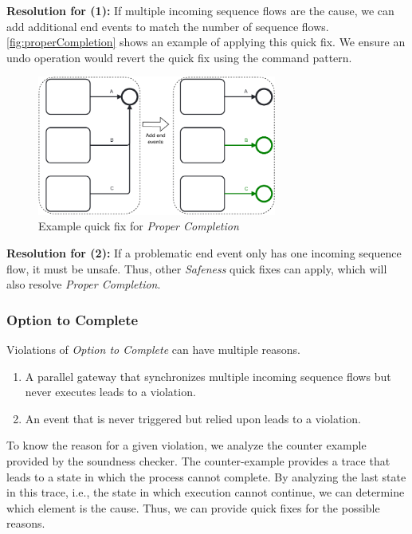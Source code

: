 \documentclass[runningheads]{llncs}
\begin{document}
\textbf{Resolution for (1):} If multiple incoming sequence flows are the cause, we can add additional end events to match the number of sequence flows.
\autoref{fig:properCompletion} shows an example of applying this quick fix.
We ensure an undo operation would revert the quick fix using the command pattern.

\begin{figure}[ht]
	\centering
	\includegraphics[width=0.7\textwidth]{images/properCompletion}
	\caption{Example quick fix for \textit{Proper Completion}}
	\label{fig:properCompletion}
\end{figure}

\textbf{Resolution for (2):} If a problematic end event only has one incoming sequence flow, it must be unsafe.
Thus, other \textit{Safeness} quick fixes can apply, which will also resolve \textit{Proper Completion}.


\subsubsection{Option to Complete}
Violations of \textit{Option to Complete} can have multiple reasons.

\begin{enumerate}
	\item A parallel gateway that synchronizes multiple incoming sequence flows but never executes leads to a violation.
	\item An event that is never triggered but relied upon leads to a violation.
\end{enumerate}

To know the reason for a given violation, we analyze the counter example provided by the soundness checker.
The counter-example provides a trace that leads to a state in which the process cannot complete.
By analyzing the last state in this trace, i.e., the state in which execution cannot continue, we can determine which element is the cause.
Thus, we can provide quick fixes for the possible reasons.
\end{document}
